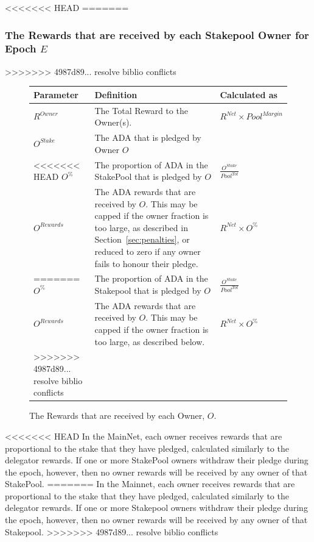 \documentclass[11pt,a4paper,dvipsnames,twosided,final]{article}
\newcommand{\khcomment}[1]{\todo[color=blue!20]{KH: #1}}
\newcommand{\ada}{ADA{}}
\begin{document}
<<<<<<< HEAD
=======
\subsubsection*{The Rewards that are received by each Stakepool Owner for Epoch $E$}

>>>>>>> 4987d89... resolve biblio conflicts

\begin{figure}[h!]
\begin{center}
\begin{tabular}{||l|p{9cm}|l||}
  \hline \hline
\textbf{Parameter}  & \textbf{Definition} & \textbf{Calculated as} \\\hline
$R^\textit{Owner}$ & The Total Reward to the Owner(s).  & $R^{\textit{Net}} \times {\textit{Pool}}^{\textit{Margin}}$ \\\hline
$O^\textit{Stake}$ & The \ada{} that is pledged by Owner $O$ & \\\hline
<<<<<<< HEAD
$O^\%$ & The proportion of \ada{} in the StakePool that is pledged by $O$ & $\frac{O^{Stake}}{Pool^{Tot}}$ \\\hline
$O^{Rewards}$ & The \ada{} rewards that are received by $O$. This may be capped if the owner fraction is too large,
as described in Section~\ref{sec:penalties}, or reduced to zero if any owner fails to honour their pledge. & $R^{\textit{Net}} \times O^\%$ \\\hline
=======
$O^\%$ & The proportion of \ada{} in the Stakepool that is pledged by $O$ & $\frac{O^{Stake}}{Pool^{Tot}}$ \\\hline
$O^{Rewards}$ & The \ada{} rewards that are received by $O$. This may be capped if the owner fraction is too large,
as described below. & $R^{\textit{Net}} \times O^\%$ \\\hline
>>>>>>> 4987d89... resolve biblio conflicts
\hline
\end{tabular}
\end{center}
\caption{The Rewards that are received by each Owner, $O$.}
\end{figure}

\noindent
<<<<<<< HEAD
In the MainNet, each owner receives rewards that are proportional to the stake that they have pledged,
calculated similarly to the delegator rewards.  If one or more StakePool owners withdraw their pledge during the epoch,
however, then no owner rewards will be received by any owner of that StakePool.
=======
In the Mainnet, each owner receives rewards that are proportional to the stake that they have pledged,
calculated similarly to the delegator rewards.  If one or more Stakepool owners withdraw their pledge during the epoch,
however, then no owner rewards will be received by any owner of that Stakepool.
>>>>>>> 4987d89... resolve biblio conflicts
\end{document}
